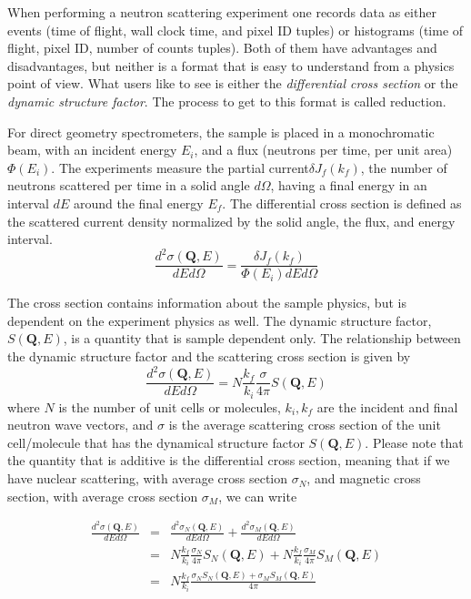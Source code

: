 When performing a neutron scattering experiment one records data as either events (time of flight, wall clock time, and pixel ID tuples) or histograms (time of flight, pixel ID, number of counts tuples). Both of them have advantages and disadvantages, but neither is a format that is easy to understand from a physics point of view. What users like to see is either the {\it differential cross section} or the {\it dynamic structure factor}. The process to get to this format is called reduction. 

For direct geometry spectrometers, the sample is placed in a monochromatic beam, with an incident energy $E_i$, and a flux (neutrons per time, per unit area) $\Phi(E_i)$. 
The experiments measure the partial current$\delta J_f(k_f)$, the number of neutrons scattered per time in a solid angle $d\Omega$, having a final energy in an interval $dE$ around the final energy $E_f$. The differential cross section is defined as the scattered current density normalized by the solid angle, the flux, and energy interval.
\begin{equation}\label{crosssection}
\frac{d^2\sigma(\textbf{Q},E)}{dE d\Omega}=\frac{\delta J_f(k_f)}{\Phi(E_i) dE d\Omega}
\end{equation} 

The cross section contains information about the sample physics, but is dependent on the experiment physics as well. The dynamic structure factor, $S(\textbf{Q},E)$, is a quantity that is sample dependent only. The relationship between the dynamic structure factor and the scattering cross section is given by
\begin{equation}\label{structurefactor}
\frac{d^2\sigma(\textbf{Q},E)}{dE d\Omega}=N\frac{k_f}{k_i}\frac{\sigma}{4\pi} S(\textbf{Q},E)
\end{equation}
where $N$ is the number of unit cells or molecules, $k_i, k_f$ are the incident and final neutron wave vectors, and $\sigma$ is the average scattering cross section of the unit cell/molecule that has the dynamical structure factor $S(\textbf{Q},E)$. Please note that the quantity that is additive is the differential cross section, meaning that if we have nuclear scattering, with average cross section $\sigma_N$, and magnetic cross section, with average cross section $\sigma_M$, we can write 
  
\begin{eqnarray*}
\frac{d^2\sigma(\textbf{Q},E)}{dE d\Omega}&=&\frac{d^2\sigma _N(\textbf{Q},E)}{dE d\Omega}+\frac{d^2\sigma _M(\textbf{Q},E)}{dE d\Omega}\\
&=&N\frac{k_f}{k_i}\frac{\sigma _N}{4\pi} S_N(\textbf{Q},E)+N\frac{k_f}{k_i}\frac{\sigma _M}{4\pi} S_M(\textbf{Q},E)\\
&=&N\frac{k_f}{k_i}\frac{\sigma _N S_N(\textbf{Q},E)+\sigma _M S_M(\textbf{Q},E) } {4\pi}
\end{eqnarray*}


